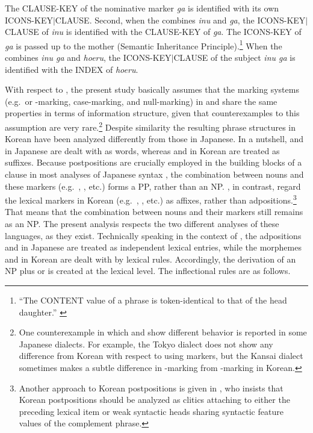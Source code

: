 \noindent The CLAUSE-KEY of the nominative marker \textit{ga} is
identified with its own
ICONS-KEY\ensuremath{\mid}CLAUSE. Second,
when the  combines \textit{inu} and \textit{ga},
the ICONS-KEY\ensuremath{\mid}CLAUSE of \textit{inu} is identified
with the CLAUSE-KEY of \textit{ga}. The ICONS-KEY of \textit{ga} is
passed up to the mother (Semantic Inheritance
Principle).\footnote{``The CONTENT value of a phrase is
  token-identical to that of the head daughter.''
  \citep[p.\ 48]{pollard:sag:94} } When the 
combines \textit{inu ga} and \textit{hoeru}, the
ICONS-KEY\ensuremath{\mid}CLAUSE of the subject \textit{inu ga} is
identified with the INDEX of \textit{hoeru}.



With respect to , the present study basically assumes that
the marking systems (e.g.\ \wa or \nun-marking, case-marking, and
null-marking) in  and  share the same
properties in terms of information structure, given that
counterexamples to this assumption are very rare.\footnote{One
  counterexample in which \wa and \nun show different behavior is
  reported in some Japanese dialects. For example, the Tokyo dialect
  does not show any difference from Korean with respect to using 
  markers, but the Kansai dialect sometimes makes a subtle difference
  in \wa-marking from \nun-marking in Korean.} Despite similarity the
resulting phrase structures in Korean have been analyzed differently
from those in Japanese. In a nutshell, \ga and \wa in Japanese are
dealt with as words, whereas \ika and \nun in Korean are treated as
suffixes.  Because postpositions are crucially employed in the
building blocks of a clause in most analyses of Japanese syntax
\citep{sato:tam:12}, the combination between nouns and these markers
(e.g.\ \ga, \wa, etc.)  forms a PP, rather than an NP. \citet{kim:yang:04}, in contrast, regard the lexical
markers in Korean (e.g.\ \ika, \nun, etc.) as affixes, rather than
adpositions.\footnote{Another approach to Korean postpositions is
  given in \citet{ko:08}, who insists that Korean postpositions should
  be analyzed as clitics attaching to either the preceding lexical
  item or weak syntactic heads sharing syntactic feature values of the
  complement phrase.}  That means that the combination between nouns
and their markers still remains as an NP. The present analysis
respects the two different analyses of these languages, as they
exist. Technically speaking in the context of , the adpositions \ga and \wa in Japanese are treated as
independent lexical entries, while the morphemes \ika and \nun in
Korean are dealt with by lexical rules.  Accordingly, the derivation
of an NP plus \ika or \nun is created at the lexical level.  The
inflectional rules are as follows.


